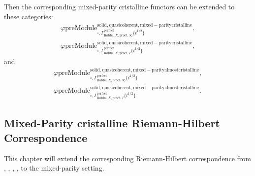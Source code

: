 \documentclass[12pt]{book}
\theoremstyle{definition}
\begin{document}
\indent Then the corresponding mixed-parity cristalline functors can be extended to these categories:
\begin{align}
\varphi\mathrm{preModule}^\mathrm{solid,quasicoherent,mixed-paritycristalline}_{\square,\Gamma^\mathrm{perfect}_{\text{Robba},X,\text{pro\'et},\infty}\{t^{1/2}\}},\\
\varphi\mathrm{preModule}^\mathrm{solid,quasicoherent,mixed-paritycristalline}_{\square,\Gamma^\mathrm{perfect}_{\text{Robba},X,\text{pro\'et},I}\{t^{1/2}\}}, 
\end{align}
and
\begin{align}
\varphi\mathrm{preModule}^\mathrm{solid,quasicoherent,mixed-parityalmostcristalline}_{\square,\Gamma^\mathrm{perfect}_{\text{Robba},X,\text{pro\'et},\infty}\{t^{1/2}\}},\\
\varphi\mathrm{preModule}^\mathrm{solid,quasicoherent,mixed-parityalmostcristalline}_{\square,\Gamma^\mathrm{perfect}_{\text{Robba},X,\text{pro\'et},I}\{t^{1/2}\}}. 
\end{align}


\subsection{Mixed-Parity cristalline Riemann-Hilbert Correspondence}

\indent This chapter will extend the corresponding Riemann-Hilbert correspondence from \cite{Sch1}, \cite{LZ}, \cite{BL1}, \cite{BL2}, \cite{M} to the mixed-parity setting.
\end{document}
